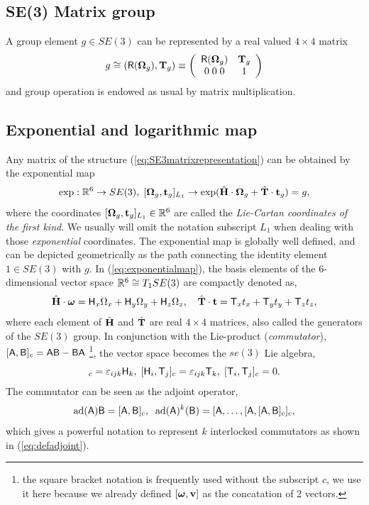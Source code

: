 \documentclass[conference]{IEEEtran}
\newcommand{\real}{\Bbb R}
\newcommand{\bfomega}{\boldsymbol{\omega}}
\newcommand{\bfOmega}{\boldsymbol{\Omega}}
\newcommand{\adj}[1]{\mathrm{ad}({#1})}
\newcommand{\beq}{\begin{equation}}
\newcommand{\eeq}{\end{equation}}
\begin{document}
\begin{appendix}
\section{SE(3) Matrix group}
\label{app:SE3group}
A group element $g\in SE(3)$ can be represented by a real valued $4\times 4$ matrix
\beq
    g \cong ({\sf R}(\bfOmega_g),{\bf T}_g) \equiv \left(
    \begin{array}{cc}
        {\sf R}(\bfOmega_g) & {\bf T}_g \\
        0\; 0\; 0 & 1
    \end{array} \right) \label{eq:SE3matrixrepresentation}
\eeq
and group operation is endowed as usual by matrix multiplication.
\subsection{Exponential and logarithmic map}
\label{app:expmap}
Any matrix of the structure (\ref{eq:SE3matrixrepresentation}) can be obtained
by the exponential map
\beq
    \exp: \real^6 \rightarrow SE(3),\;
    [\bfOmega_g, {\bf t}_g]_{L_1} \rightarrow
    \exp( \hat{\bf H}\cdot\bfOmega_g + \hat{\bf T}\cdot{\bf t}_g ) = g,
    \label{eq:exponentialmap}
\eeq
where the coordinates $[\bfOmega_g,{\bf t}_g]_{L_1} \in \real^6$ are called the
{\em Lie-Cartan coordinates of the first kind}. We usually will omit the notation subscript
$L_1$ when dealing with those {\em exponential} coordinates. The exponential map is globally well defined,
and can be depicted geometrically as the path connecting the identity element $1\in SE(3)$ with
$g$. In (\ref{eq:exponentialmap}), the basis elements
of the 6-dimensional vector space $\real^6\cong T_1SE(3)$ are compactly denoted as,
\beq
    \hat{\bf H}\cdot\bfomega={\sf H}_x\Omega_x+{\sf H}_y\Omega_y+{\sf H}_z\Omega_z,\quad
    \hat{\bf T}\cdot{\bf t} ={\sf T}_x t_x + {\sf T}_y t_y + {\sf T}_z t_z,
    \label{eq:generatingmatrices}
\eeq
where each element of $\hat{\bf H}$ and $\hat{\bf T}$ are real $4\times 4$ matrices,
also called the generators of the $SE(3)$ group. In conjunction with the Lie-product
({\em commutator}), $[{\sf A},{\sf B}]_c = {\sf AB}-{\sf BA}$ \footnote{the square bracket
notation is frequently used without the subscript $c$, we use it here because we already
defined $[{\bfomega},{\bf v}]$ as the concatation of 2 vectors.},
the vector space becomes the $se(3)$ Lie algebra,
\beq
    [{\sf H}_i,{\sf H}_j]_c = \varepsilon_{ijk}{\sf H}_k,\;
    [{\sf H}_i,{\sf T}_j]_c = \varepsilon_{ijk}{\sf T}_k,\;
    [{\sf T}_i, {\sf T}_j]_c = 0. \label{eq:commutatortable}
\eeq
The commutator can be seen as the adjoint operator,
\beq
    \adj{\sf A} {\sf B} = [{\sf A},{\sf B}]_c, \;\;
    \adj{\sf A}^k({\sf B}) = [{\sf A},\ldots,[{\sf A},[{\sf A},{\sf B}]_c]_c,
    \label{eq:defadjoint}
\eeq
which gives a powerful notation to represent $k$ interlocked commutators
as shown in (\ref{eq:defadjoint}).


\end{appendix}
\end{document}
